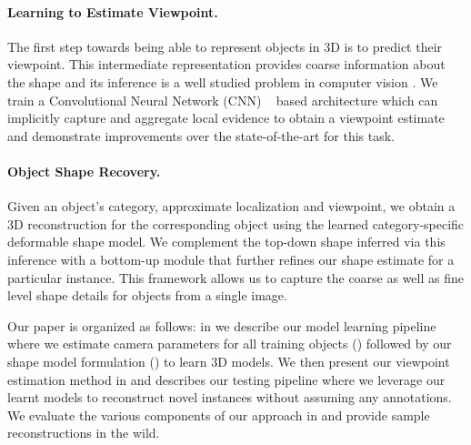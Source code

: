 \paragraph{Learning to Estimate Viewpoint.}
The first step towards being able to represent objects in 3D is to predict their viewpoint. This intermediate representation provides coarse information about the shape and its inference is a well studied problem in computer vision \cite{huttenlocher1990recognizing, rothganger20063d, gordon2006and, savarese2008view, xiao2008structuring, gu2010discriminative, ozuysal2009pose}.
We train a Convolutional Neural Network (CNN) ~\cite{neocognitron,LeCun1989} based architecture which can implicitly capture and aggregate local evidence to obtain a viewpoint estimate and demonstrate improvements over the state-of-the-art for this task.

\paragraph{Object Shape Recovery.}
Given an object's category, approximate localization and viewpoint, we obtain a 3D reconstruction for the corresponding object using the learned category-specific deformable shape model. We complement the top-down shape inferred via this inference with a bottom-up module that further refines our shape estimate for a particular instance. This framework allows us to capture the coarse as well as fine level shape details for objects from a single image.

Our paper is organized as follows: in  we describe our model learning pipeline where we estimate camera parameters for all training objects () followed by our shape model formulation () to learn 3D models. We then present our viewpoint estimation method in  and   describes our testing pipeline where we leverage our learnt models to reconstruct novel instances without assuming any annotations. We evaluate the various components of our approach in  and provide sample reconstructions in the wild.

